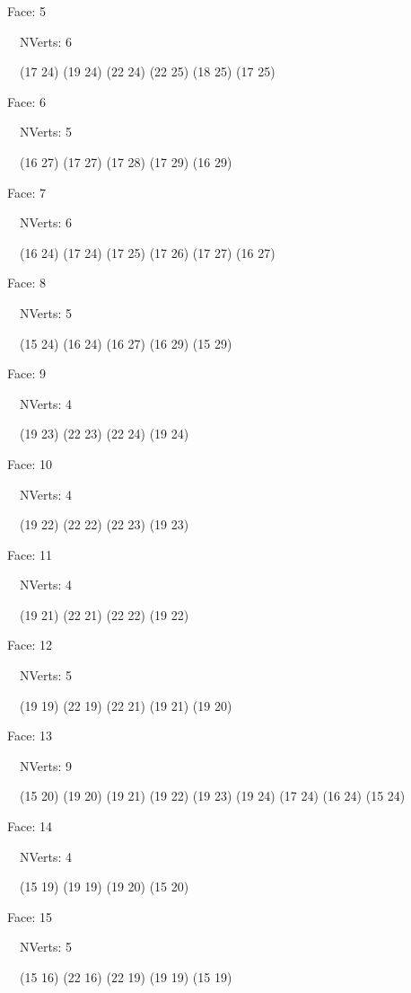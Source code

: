 \documentclass{article}
\begin{document}
{\footnotesize 

Face: 5

\   \    NVerts: 6

 \   \   (17 24) (19 24) (22 24) (22 25) (18 25) (17 25)}

{\footnotesize 

Face: 6

\   \    NVerts: 5

 \   \   (16 27) (17 27) (17 28) (17 29) (16 29)}

{\footnotesize 

Face: 7

\   \    NVerts: 6

 \   \   (16 24) (17 24) (17 25) (17 26) (17 27) (16 27)}

{\footnotesize 

Face: 8

\   \    NVerts: 5

 \   \   (15 24) (16 24) (16 27) (16 29) (15 29)}

{\footnotesize 

Face: 9

\   \    NVerts: 4

 \   \   (19 23) (22 23) (22 24) (19 24)}

{\footnotesize 

Face: 10

\   \    NVerts: 4

 \   \   (19 22) (22 22) (22 23) (19 23)}

{\footnotesize 

Face: 11

\   \    NVerts: 4

 \   \   (19 21) (22 21) (22 22) (19 22)}

{\footnotesize 

Face: 12

\   \    NVerts: 5

 \   \   (19 19) (22 19) (22 21) (19 21) (19 20)}

{\footnotesize 

Face: 13

\   \    NVerts: 9

 \   \   (15 20) (19 20) (19 21) (19 22) (19 23) (19 24) (17 24) (16 24) (15 24)}

{\footnotesize 

Face: 14

\   \    NVerts: 4

 \   \   (15 19) (19 19) (19 20) (15 20)}

{\footnotesize 

Face: 15

\   \    NVerts: 5

 \   \   (15 16) (22 16) (22 19) (19 19) (15 19)}
\end{document}
